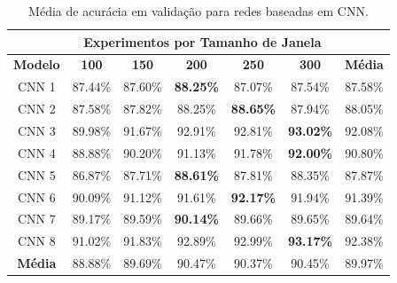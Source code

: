 \begin{table}[H]
\scriptsize
\centering
\caption{Média de acurácia em validação para redes baseadas em CNN.} 
\label{table:cnn_results_tipo_superficie_1}
\begin{tabular}{ccccccc}
\cmidrule(lr){2-6}
& \multicolumn{5}{c}{\textbf{Experimentos por Tamanho de Janela}} & \multicolumn{1}{c}{} \\ \midrule
\textbf{Modelo} & \textbf{100} & \textbf{150} & \textbf{200} & \textbf{250} & \textbf{300} & \textbf{Média} \\ \midrule
CNN 1 & 87.44\% & 87.60\% & \textbf{88.25\%} & 87.07\% & 87.54\% & 87.58\% \\ \midrule
CNN 2 & 87.58\% & 87.82\% & 88.25\% & \textbf{88.65\%} & 87.94\% & 88.05\% \\ \midrule
CNN 3 & 89.98\% & 91.67\% & 92.91\% & 92.81\% & \textbf{93.02\%} & 92.08\% \\ \midrule
CNN 4 & 88.88\% & 90.20\% & 91.13\% & 91.78\% & \textbf{92.00\%} & 90.80\% \\ \midrule
CNN 5 & 86.87\% & 87.71\% & \textbf{88.61\%} & 87.81\% & 88.35\% & 87.87\% \\ \midrule
CNN 6 & 90.09\% & 91.12\% & 91.61\% & \textbf{92.17\%} & 91.94\% & 91.39\% \\ \midrule
CNN 7 & 89.17\% & 89.59\% & \textbf{90.14\%} & 89.66\% & 89.65\% & 89.64\% \\ \midrule
CNN 8 & 91.02\% & 91.83\% & 92.89\% & 92.99\% & \cellcolor[HTML]{34FF34}\textbf{93.17\%} & 92.38\% \\ \midrule
\textbf{Média} & 88.88\% & 89.69\% & 90.47\% & 90.37\% & 90.45\% & 89.97\% \\ \bottomrule
\end{tabular}
\end{table}

